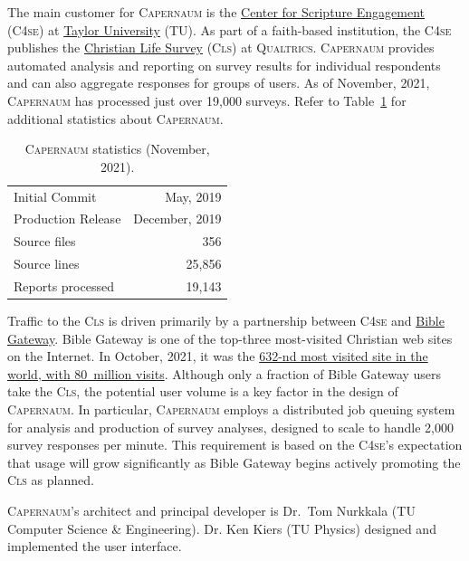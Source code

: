 \documentclass{article}
\newcommand{\caper}{\textsc{Capernaum}}
\newcommand{\cfse}{\textsc{C4se}}
\newcommand{\cls}{\textsc{Cls}}
\newcommand{\tu}{TU}
\newcommand{\qual}{\textsc{Qualtrics}}
\begin{document}
The main customer for \caper{}
is the
\href{https://www.taylor.edu/center-for-scripture-engagement/}{Center for Scripture Engagement}
(\cfse)
at \href{https://www.taylor.edu/}{Taylor University} (\tu).
As part of a faith-based institution,
the \cfse{} publishes the
\href{https://www.taylor.edu/center-for-scripture-engagement/survey/}{Christian Life Survey}
(\cls)
at \qual.
\caper{} provides automated analysis and reporting on survey results
for individual respondents and
can also aggregate responses for groups of users.
As of November, 2021,
\caper{} has processed just over 19,000 surveys.
Refer to Table~\ref{tab:caper-stats} for additional statistics about \caper.

\begin{table}
  \centering
  \begin{tabular}{lr}
    \toprule
    Initial Commit     & May, 2019      \\
    Production Release & December, 2019 \\
    \midrule
    Source files       & 356            \\
    Source lines       & 25,856         \\
    \midrule
    Reports processed  & 19,143         \\
    \bottomrule
  \end{tabular}
  \caption{\caper{} statistics (November, 2021).}
  \label{tab:caper-stats}
\end{table}

Traffic to the \cls{} is driven primarily by a partnership between \cfse{} and
\href{https://www.biblegateway.com/}{Bible Gateway}.
Bible Gateway is one of the top-three most-visited Christian web sites on the Internet.
In October, 2021, it was the
\href{https://www.similarweb.com/website/biblegateway.com/}{632-nd most visited site in the world,
  with 80~million visits}.
Although only a fraction of Bible Gateway users take the \cls,
the potential user volume is a key factor in the design of \caper.
In particular, \caper{} employs a distributed job queuing system
for analysis and production of survey analyses,
designed to scale to handle 2,000 survey responses per minute.
This requirement is based on the \cfse{}'s
expectation that usage will grow significantly as Bible Gateway
begins actively promoting the \cls{} as planned.

\caper's architect and principal developer
is Dr.\ Tom Nurkkala (\tu{} Computer Science \& Engineering).
Dr. Ken Kiers (\tu{} Physics)
designed and implemented the user interface.
\end{document}
